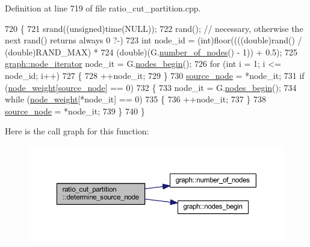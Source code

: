 Definition at line 719 of file ratio\+\_\+cut\+\_\+partition.\+cpp.


\begin{DoxyCode}
720 \{
721     srand((\textcolor{keywordtype}{unsigned})time(NULL));
722     rand(); \textcolor{comment}{// necessary, otherwise the next rand() returns always 0 ?-)}
723     \textcolor{keywordtype}{int} node\_id = (int)floor((((\textcolor{keywordtype}{double})rand() / (\textcolor{keywordtype}{double})RAND\_MAX) *
724     (\textcolor{keywordtype}{double})(G.\mbox{\hyperlink{classgraph_a42c78e0a9f115655e3ff0efe35ebfc4e}{number\_of\_nodes}}() - 1)) + 0.5);
725     \mbox{\hyperlink{classgraph_a2cb374b84c133ce13f94e73c3e5da7fa}{graph::node\_iterator}} node\_it = G.\mbox{\hyperlink{classgraph_aec053a4b509d1be804237a80044c54c0}{nodes\_begin}}();
726     \textcolor{keywordflow}{for} (\textcolor{keywordtype}{int} i = 1; i <= node\_id; i++)
727     \{
728     ++node\_it;
729     \}
730     \mbox{\hyperlink{classratio__cut__partition_abb18c3acafc590e258453d7a8d86bb49}{source\_node}} = *node\_it;
731     \textcolor{keywordflow}{if} (\mbox{\hyperlink{classratio__cut__partition_a4d9d2a9317a062f839ea7155c37b173f}{node\_weight}}[\mbox{\hyperlink{classratio__cut__partition_abb18c3acafc590e258453d7a8d86bb49}{source\_node}}] == 0)
732     \{
733     node\_it = G.\mbox{\hyperlink{classgraph_aec053a4b509d1be804237a80044c54c0}{nodes\_begin}}();
734     \textcolor{keywordflow}{while} (\mbox{\hyperlink{classratio__cut__partition_a4d9d2a9317a062f839ea7155c37b173f}{node\_weight}}[*node\_it] == 0)
735     \{
736         ++node\_it;
737     \}
738     \mbox{\hyperlink{classratio__cut__partition_abb18c3acafc590e258453d7a8d86bb49}{source\_node}} = *node\_it;
739     \}
740 \}
\end{DoxyCode}
Here is the call graph for this function\+:\nopagebreak
\begin{figure}[H]
\begin{center}
\leavevmode
\includegraphics[width=350pt]{classratio__cut__partition_a7d3397f85318f781fbae287037e0ae33_cgraph}
\end{center}
\end{figure}
